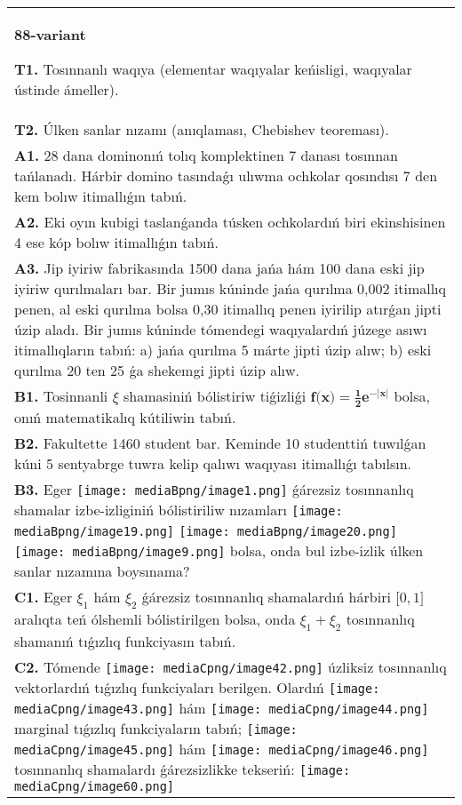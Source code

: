 \documentclass{article}
\begin{document}
\begin{tabular}{m{17cm}}
\textbf{88-variant}
\newline

\textbf{T1.} Tosınnanlı waqıya (elementar waqıyalar keńisligi, waqıyalar ústinde ámeller).
 \\
\textbf{T2.} 
Úlken sanlar nızamı (anıqlaması, Chebishev teoreması).
 \\
\textbf{A1.} 28 dana dominonıń tolıq komplektinen 7 danası tosınnan tańlanadı. Hárbir domino tasındaǵı ulıwma ochkolar qosındısı 7 den kem bolıw itimallıǵın tabıń.
 \\
\textbf{A2.} Eki oyın kubigi taslanǵanda túsken ochkolardıń biri ekinshisinen 4 ese kóp bolıw itimallıǵın tabıń.
 \\
\textbf{A3.} Jip iyiriw fabrikasında 1500 dana jańa hám 100 dana eski jip iyiriw qurılmaları bar. Bir jumıs kúninde jańa qurılma 0,002 itimallıq penen, al eski qurılma bolsa 0,30 itimallıq penen iyirilip atırǵan jipti úzip aladı. Bir jumıs kúninde tómendegi waqıyalardıń júzege asıwı itimallıqların tabıń: a) jańa qurılma 5 márte jipti úzip alıw; b) eski qurılma 20 ten 25 ǵa shekemgi jipti úzip alıw. 
 \\
\textbf{B1.} Tosinnanli $\xi$ shamasiniń bólistiriw tiǵizliǵi \(\mathbf{f}\mathbf{(}\mathbf{x}\mathbf{)}\mathbf{=}\frac{\mathbf{1}}{\mathbf{2}}\mathbf{e}^{\mathbf{-}\left| \mathbf{x} \right|}\) bolsa, onıń matematikalıq kútiliwin tabıń.
 \\
\textbf{B2.} Fakultette 1460 student bar. Keminde 10 studenttiń tuwılǵan kúni 5 sentyabrge tuwra kelip qalıwı waqıyası itimallıǵı tabılsın.
 \\
\textbf{B3.} Eger \texttt{[image: mediaBpng/image1.png]} ǵárezsiz tosınnanlıq shamalar izbe-izliginiń bólistiriliw nızamları
\texttt{[image: mediaBpng/image19.png]} \texttt{[image: mediaBpng/image20.png]} \texttt{[image: mediaBpng/image9.png]}
bolsa, onda bul izbe-izlik úlken sanlar nızamına boysınama?
 \\
\textbf{C1.} Eger \(\xi_{1}\) hám \(\xi_{2}\) ǵárezsiz tosınnanlıq shamalardıń hárbiri \(\lbrack 0,1\rbrack\) aralıqta teń ólshemli bólistirilgen bolsa, onda \(\xi_{1} + \xi_{2}\) tosınnanlıq shamanıń tıǵızlıq funkciyasın tabıń.
 \\
\textbf{C2.} Tómende \texttt{[image: mediaCpng/image42.png]} úzliksiz tosınnanlıq vektorlardıń tıǵızlıq funkciyaları berilgen. Olardıń \texttt{[image: mediaCpng/image43.png]} hám \texttt{[image: mediaCpng/image44.png]} marginal tıǵızlıq funkciyaların tabıń; \texttt{[image: mediaCpng/image45.png]} hám \texttt{[image: mediaCpng/image46.png]} tosınnanlıq shamalardı ǵárezsizlikke tekseriń: \texttt{[image: mediaCpng/image60.png]}

\end{tabular}
\end{document}
